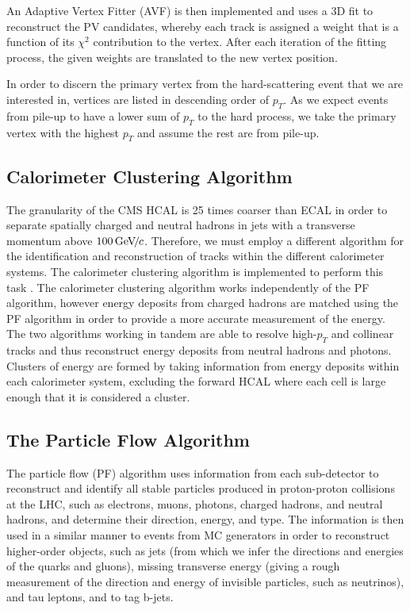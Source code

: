 An Adaptive Vertex Fitter (AVF) \cite{1742-6596-110-9-092009} is then implemented and uses a 3D fit to reconstruct the PV candidates, whereby each track is assigned a weight that is a function of its $\chi^2$ contribution to the vertex. After each iteration of the fitting process, the given weights are translated to the new vertex position. 

In order to discern the primary vertex from the hard-scattering event that we are interested in, vertices are listed in descending order of $p_T$. As we expect events from pile-up to have a lower sum of $p_T$ to the hard process, we take the primary vertex with the highest $p_T$ and assume the rest are from pile-up.  

\subsection{Calorimeter Clustering Algorithm} \label{subsec-CalorimeterClusteringAlgorithm}

The granularity of the CMS HCAL is 25 times coarser than ECAL in order to separate spatially charged and neutral hadrons in jets with a transverse momentum above $100 {\,\text{Ge\hspace{-.08em}V\hspace{-0.16em}/\hspace{-0.08em}}c}$. Therefore, we must employ a different algorithm for the identification and reconstruction of tracks within the different calorimeter systems. The calorimeter clustering algorithm is implemented to perform this task \cite{CMS-PAS-PFT-09-001}. The calorimeter clustering algorithm works independently of the PF algorithm, however energy deposits from charged hadrons are matched using the PF algorithm in order to provide a more accurate measurement of the energy. The two algorithms working in tandem are able to resolve high-$p_T$ and collinear tracks and thus reconstruct energy deposits from neutral hadrons and photons. Clusters of energy are formed by taking information from energy deposits within each calorimeter system, excluding the forward HCAL where each cell is large enough that it is considered a cluster.


\subsection{The Particle Flow Algorithm} \label{subsec-PFAlgorithm}

The particle flow (PF) algorithm \cite{CMS-PAS-PFT-09-001} uses information from each sub-detector to reconstruct and identify all stable particles produced in proton-proton collisions at the LHC, such as electrons, muons, photons, charged hadrons, and neutral hadrons, and determine their direction, energy, and type. The information is then used in a similar manner to events from MC generators in order to reconstruct higher-order objects, such as jets (from which we infer the directions and energies of the quarks and gluons), missing transverse energy (giving a rough measurement of the direction and energy of invisible particles, such as neutrinos), and tau leptons, and to tag b-jets.  

